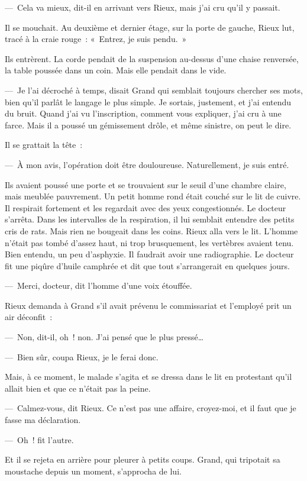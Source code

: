 \documentclass[french,twoside]{book} %
\begin{document}
— Cela va mieux, dit-il en arrivant vers Rieux, mais j’ai cru qu’il y passait.\par
Il se mouchait. Au deuxième et dernier étage, sur la porte de gauche, Rieux lut, tracé à la craie rouge : « Entrez, je suis pendu. »\par
Ils entrèrent. La corde pendait de la suspension au-dessus d’une chaise renversée, la table poussée dans un coin. Mais elle pendait dans le vide.\par
— Je l’ai décroché à temps, disait Grand qui semblait toujours chercher ses mots, bien qu’il parlât le langage le plus simple. Je sortais, justement, et j’ai entendu du bruit. Quand j’ai vu l’inscription, comment vous expliquer, j’ai cru à une farce. Mais il a poussé un gémissement drôle, et même sinistre, on peut le dire.\par
Il se grattait la tête :\par
— À mon avis, l’opération doit être douloureuse. Naturellement, je suis entré.\par
Ils avaient poussé une porte et se trouvaient sur le seuil d’une chambre claire, mais meublée pauvrement. Un petit homme rond était couché sur le lit de cuivre. Il respirait fortement et les regardait avec des yeux congestionnés. Le docteur s’arrêta. Dans les intervalles de la respiration, il lui semblait entendre des petits cris de rats. Mais rien ne bougeait dans les coins. Rieux alla vers le lit. L’homme n’était pas tombé d’assez haut, ni trop brusquement, les vertèbres avaient tenu. Bien entendu, un peu d’asphyxie. Il faudrait avoir une radiographie. Le docteur fit une piqûre d’huile camphrée et dit que tout s’arrangerait en quelques jours.\par
— Merci, docteur, dit l’homme d’une voix étouffée.\par
Rieux demanda à Grand s’il avait prévenu le commissariat et l’employé prit un air déconfit :\par
— Non, dit-il, oh ! non. J’ai pensé que le plus pressé…\par
— Bien sûr, coupa Rieux, je le ferai donc.\par
Mais, à ce moment, le malade s’agita et se dressa dans le lit en protestant qu’il allait bien et que ce n’était pas la peine.\par
— Calmez-vous, dit Rieux. Ce n’est pas une affaire, croyez-moi, et il faut que je fasse ma déclaration.\par
— Oh ! fit l’autre.\par
Et il se rejeta en arrière pour pleurer à petits coups. Grand, qui tripotait sa moustache depuis un moment, s’approcha de lui.\par
\end{document}
